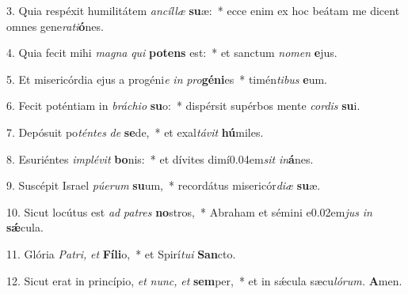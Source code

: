 \item 3. Quia respéxit humilitátem \textit{ancíllæ} \textbf{su}æ:~* ecce enim ex hoc beátam me dicent omnes gene\textit{rati}\textbf{ó}nes.

\item 4. Quia fecit mihi \textit{magna} \textit{qui} \textbf{pot}\textbf{ens} est:~* et sanctum \textit{nomen} \textbf{e}jus.

\item 5. Et misericórdia ejus a progéni\textit{e} \textit{in} \textit{pro}\textbf{gé}\textbf{ni}es~* timén\textit{tibus} \textbf{e}um.

\item 6. Fecit poténtiam in \textit{bráchio} \textbf{su}o:~* dispérsit supérbos mente \textit{cordis} \textbf{su}i.

\item 7. Depósuit po\textit{téntes} \textit{de} \textbf{se}de,~* et exal\textit{távit} \textbf{hú}miles.

\item 8. Esuriéntes \textit{implévit} \textbf{bo}nis:~* et dívites dimí\kern 0.04em\textit{sit} \textit{in}\textbf{á}nes.

\item 9. Suscépit Israel \textit{púerum} \textbf{su}um,~* recordátus misericór\textit{diæ} \textbf{su}æ.

\item 10. Sicut locútus est \textit{ad} \textit{pa}\textit{tres} \textbf{no}stros,~* Abraham et sémini e\kern 0.02em\textit{jus} \textit{in} \textbf{sǽ}cula.

\item 11. Glória \textit{Pa}\textit{tri,} \textit{et} \textbf{Fí}\textbf{li}o,~* et Spirí\textit{tui} \textbf{San}cto.

\item 12. Sicut erat in princípio, \textit{et} \textit{nunc,} \textit{et} \textbf{sem}per,~* et in sǽcula sæcu\hspace{0.03em}\textit{lórum.} \textbf{A}men.

